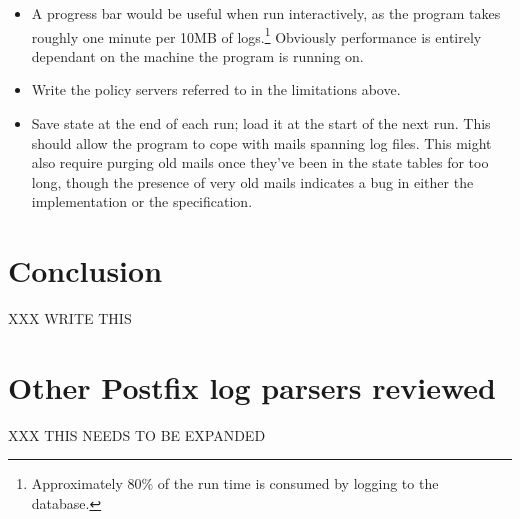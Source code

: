 \documentclass[a4paper,12pt,draft]{article}
\begin{document}
\begin{itemize}

    \item A progress bar would be useful when run interactively, as the
        program takes roughly one minute per 10MB of
        logs.\footnote{Approximately 80\% of the run time is consumed by
        logging to the database.}  Obviously performance is entirely
        dependant on the machine the program is running on.

    \item Write the policy servers referred to in the limitations above.

    \item Save state at the end of each run; load it at the start of the
        next run.  This should allow the program to cope with mails
        spanning log files.  This might also require purging old mails once
        they've been in the state tables for too long, though the presence
        of very old mails indicates a bug in either the implementation or
        the specification.

\end{itemize}

\section{Conclusion}

\label{conclusion}

XXX WRITE THIS


\appendix


\section{Other Postfix log parsers reviewed}

XXX THIS NEEDS TO BE EXPANDED

\label{other-parsers}
\end{document}
